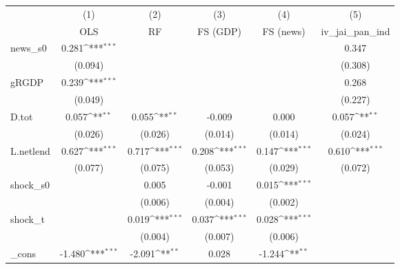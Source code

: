 {
\def\sym#1{\ifmmode^{#1}\else\(^{#1}\)\fi}
\begin{tabular}{l*{5}{c}}
\toprule
            &\multicolumn{1}{c}{(1)}&\multicolumn{1}{c}{(2)}&\multicolumn{1}{c}{(3)}&\multicolumn{1}{c}{(4)}&\multicolumn{1}{c}{(5)}\\
            &\multicolumn{1}{c}{OLS}&\multicolumn{1}{c}{RF}&\multicolumn{1}{c}{FS (GDP)}&\multicolumn{1}{c}{FS (news)}&\multicolumn{1}{c}{iv\_jai\_pan\_ind}\\
\midrule
news\_s0     &       0.281\sym{***}&                     &                     &                     &       0.347         \\
            &     (0.094)         &                     &                     &                     &     (0.308)         \\
\addlinespace
gRGDP       &       0.239\sym{***}&                     &                     &                     &       0.268         \\
            &     (0.049)         &                     &                     &                     &     (0.227)         \\
\addlinespace
D.tot       &       0.057\sym{**} &       0.055\sym{**} &      -0.009         &       0.000         &       0.057\sym{**} \\
            &     (0.026)         &     (0.026)         &     (0.014)         &     (0.014)         &     (0.024)         \\
\addlinespace
L.netlend   &       0.627\sym{***}&       0.717\sym{***}&       0.208\sym{***}&       0.147\sym{***}&       0.610\sym{***}\\
            &     (0.077)         &     (0.075)         &     (0.053)         &     (0.029)         &     (0.072)         \\
\addlinespace
shock\_s0    &                     &       0.005         &      -0.001         &       0.015\sym{***}&                     \\
            &                     &     (0.006)         &     (0.004)         &     (0.002)         &                     \\
\addlinespace
shock\_t     &                     &       0.019\sym{***}&       0.037\sym{***}&       0.028\sym{***}&                     \\
            &                     &     (0.004)         &     (0.007)         &     (0.006)         &                     \\
\addlinespace
\_cons      &      -1.480\sym{***}&      -2.091\sym{**} &       0.028         &      -1.244\sym{**} &                     \\

\end{tabular}}
